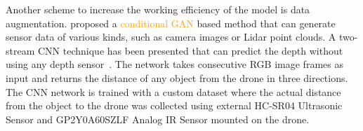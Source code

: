 Another scheme to increase the working efficiency of the model is data augmentation. 
 proposed a \textcolor{orange}{conditional GAN \cite{isola2017image}} based method that can generate sensor data of various kinds, such as camera images or Lidar point clouds.
A two-stream CNN technique has been presented that can predict the depth without using any depth sensor~\cite{kouris2018learning}. The network takes consecutive RGB image frames as input and returns the distance of any object from the drone in three directions. The CNN network is trained with a custom dataset where the actual distance from the object to the drone was collected using external HC-SR04 Ultrasonic Sensor and GP2Y0A60SZLF Analog IR Sensor mounted on the drone.